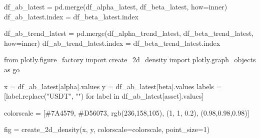 \documentclass[
  letterpaper,
  DIV=11,
  numbers=noendperiod]{scrartcl}
\newenvironment{Shaded}{\begin{snugshade}}{\end{snugshade}}
\newcommand{\ControlFlowTok}[1]{\textcolor[rgb]{0.00,0.23,0.31}{#1}}
\newcommand{\DecValTok}[1]{\textcolor[rgb]{0.68,0.00,0.00}{#1}}
\newcommand{\FloatTok}[1]{\textcolor[rgb]{0.68,0.00,0.00}{#1}}
\newcommand{\ImportTok}[1]{\textcolor[rgb]{0.00,0.46,0.62}{#1}}
\newcommand{\KeywordTok}[1]{\textcolor[rgb]{0.00,0.23,0.31}{#1}}
\newcommand{\NormalTok}[1]{\textcolor[rgb]{0.00,0.23,0.31}{#1}}
\newcommand{\OperatorTok}[1]{\textcolor[rgb]{0.37,0.37,0.37}{#1}}
\newcommand{\StringTok}[1]{\textcolor[rgb]{0.13,0.47,0.30}{#1}}
\begin{document}
\begin{Shaded}
\begin{Highlighting}[]
\NormalTok{df\_ab\_latest }\OperatorTok{=}\NormalTok{ pd.merge(df\_alpha\_latest, df\_beta\_latest, how}\OperatorTok{=}\StringTok{\textquotesingle{}inner\textquotesingle{}}\NormalTok{)}
\NormalTok{df\_ab\_latest.index }\OperatorTok{=}\NormalTok{ df\_beta\_latest.index}

\NormalTok{df\_ab\_trend\_latest }\OperatorTok{=}\NormalTok{ pd.merge(df\_alpha\_trend\_latest, df\_beta\_trend\_latest, how}\OperatorTok{=}\StringTok{\textquotesingle{}inner\textquotesingle{}}\NormalTok{)}
\NormalTok{df\_ab\_trend\_latest.index }\OperatorTok{=}\NormalTok{ df\_beta\_trend\_latest.index}
\end{Highlighting}
\end{Shaded}

\begin{Shaded}
\begin{Highlighting}[]
\ImportTok{from}\NormalTok{ plotly.figure\_factory }\ImportTok{import}\NormalTok{ create\_2d\_density}
\ImportTok{import}\NormalTok{ plotly.graph\_objects }\ImportTok{as}\NormalTok{ go}

\NormalTok{x }\OperatorTok{=}\NormalTok{ df\_ab\_latest[}\StringTok{\textquotesingle{}alpha\textquotesingle{}}\NormalTok{].values}
\NormalTok{y }\OperatorTok{=}\NormalTok{ df\_ab\_latest[}\StringTok{\textquotesingle{}beta\textquotesingle{}}\NormalTok{].values}
\NormalTok{labels }\OperatorTok{=}\NormalTok{ [label.replace(}\StringTok{"USDT"}\NormalTok{, }\StringTok{""}\NormalTok{) }\ControlFlowTok{for}\NormalTok{ label }\KeywordTok{in}\NormalTok{ df\_ab\_latest[}\StringTok{\textquotesingle{}asset\textquotesingle{}}\NormalTok{].values]}

\NormalTok{colorscale }\OperatorTok{=}\NormalTok{ [}\StringTok{\textquotesingle{}\#7A4579\textquotesingle{}}\NormalTok{, }\StringTok{\textquotesingle{}\#D56073\textquotesingle{}}\NormalTok{, }\StringTok{\textquotesingle{}rgb(236,158,105)\textquotesingle{}}\NormalTok{, (}\DecValTok{1}\NormalTok{, }\DecValTok{1}\NormalTok{, }\FloatTok{0.2}\NormalTok{), (}\FloatTok{0.98}\NormalTok{,}\FloatTok{0.98}\NormalTok{,}\FloatTok{0.98}\NormalTok{)]}

\NormalTok{fig }\OperatorTok{=}\NormalTok{ create\_2d\_density(x, y, colorscale}\OperatorTok{=}\NormalTok{colorscale, point\_size}\OperatorTok{=}\DecValTok{1}\NormalTok{)}


\end{Highlighting}
\end{Shaded}
\end{document}
